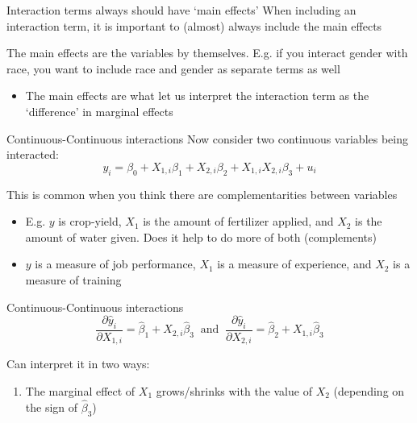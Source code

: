 \documentclass[aspectratio=169,t,11pt,table]{beamer}
\begin{document}
\begin{frame}{Interaction terms always should have `main effects'}
  When including an interaction term, it is important to (almost) always include the \alert{main effects}

  \bigskip
  The \alert{main effects} are the variables by themselves. E.g. if you interact gender with race, you want to include race and gender as separate terms as well 
  \begin{itemize}
    \item The main effects are what let us interpret the interaction term as the `difference' in marginal effects
  \end{itemize}
\end{frame}

\begin{frame}{Continuous-Continuous interactions}
  Now consider two continuous variables being interacted:
  $$
    y_i = \beta_0 + X_{1,i} \beta_1 + X_{2,i} \beta_2 + X_{1,i} X_{2,i} \beta_3 + u_i
  $$
  
  \bigskip
  This is common when you think there are complementarities between variables 
  \begin{itemize}
    \item E.g. $y$ is crop-yield, $X_1$ is the amount of fertilizer applied, and $X_2$ is the amount of water given. Does it help to do more of both (complements)
    
    \item $y$ is a measure of job performance, $X_1$ is a measure of experience, and $X_2$ is a measure of training
  \end{itemize}
\end{frame}

\begin{frame}{Continuous-Continuous interactions}
  $$
    \frac{\partial \hat{y}_i}{\partial X_{1,i}} = \hat{\beta}_1 + X_{2,i} \hat{\beta}_3 
    \ \text{ and }\ 
    \frac{\partial \hat{y}_i}{\partial X_{2,i}} = \hat{\beta}_2 + X_{1,i} \hat{\beta}_3
  $$

  \bigskip
  Can interpret it in two ways:
  \begin{enumerate}
    \item The marginal effect of $X_{1}$ grows/shrinks with the value of $X_{2}$ (depending on the sign of $\hat{\beta}_3$)
  \end{enumerate}
\end{frame}
\end{document}
